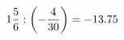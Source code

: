 \documentclass[preview]{standalone}
\begin{document}
\begin{align*}
1 { 5 \over 6 }  :  \left( - { 4 \over 30 } \right) = -13.75
\end{align*}
\end{document}

